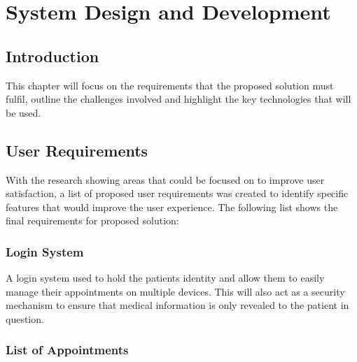 
\chapter{System Design and Development} %

\label{Chapter4} %



\section{Introduction}

This chapter will focus on the requirements that the proposed solution must fulfil, outline the challenges involved and highlight the key technologies that will be used.



\section{User Requirements}

With the research showing areas that could be focused on to improve user satisfaction, a list of proposed user requirements was  created to identify specific features that would improve the user experience. The following list shows the final requirements for proposed solution:

\subsection{Login System}

A login system used to hold the patients identity and allow them to easily manage their appointments on multiple devices. This will also act as a security mechanism to ensure that medical information is only revealed to the patient in question.

\subsection{List of Appointments}

